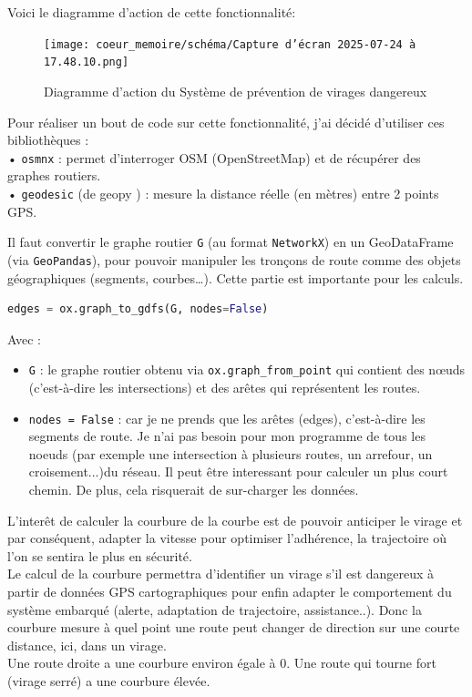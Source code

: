 Voici le diagramme d'action de cette fonctionnalité:\\

\begin{figure}[H]
    \centering
    \texttt{[image: coeur\_memoire/schéma/Capture d’écran 2025-07-24 à 17.48.10.png]} 
    \caption{Diagramme d'action du Système de prévention de virages dangereux}
\end{figure}

Pour réaliser un bout de code sur cette fonctionnalité, j'ai décidé d'utiliser ces bibliothèques :\\
• \texttt{osmnx}\cite{osm_doc} : permet d’interroger OSM (OpenStreetMap) et de récupérer des graphes routiers.\\
• \texttt{geodesic} (de geopy \cite{geopy}) : mesure la distance réelle (en mètres) entre 2 points GPS.
\vspace{0.5cm}

Il faut convertir le graphe routier \texttt{G} (au format \texttt{NetworkX}) en un GeoDataFrame (via \texttt{GeoPandas}), pour pouvoir manipuler les tronçons de route comme des objets géographiques (segments, courbes…). Cette partie est importante pour les calculs.
\begin{lstlisting}[language=Python, caption={Conversion du graphe routier}]
edges = ox.graph_to_gdfs(G, nodes=False)
\end{lstlisting}
Avec : \\
\begin{itemize}
    \item \texttt{G} : le graphe routier obtenu via \texttt{ox.graph\_from\_point} qui contient des nœuds (c'est-à-dire les intersections) et des arêtes qui représentent les routes.
    \item \texttt{nodes = False} : car je ne prends que les arêtes (edges), c’est-à-dire les segments de route. Je n'ai pas besoin pour mon programme de tous les noeuds (par exemple une intersection à plusieurs routes, un arrefour, un croisement...)du réseau. Il peut être interessant pour calculer un plus court chemin. De plus, cela risquerait de sur-charger les données.
\end{itemize}

\vspace{0.5cm}
L'interêt de calculer la courbure de la courbe est de pouvoir anticiper le virage et par conséquent, adapter la vitesse pour optimiser l'adhérence, la trajectoire où l'on se sentira le plus en sécurité. \\
Le calcul de la courbure permettra d'identifier un virage s'il est dangereux à partir de données GPS cartographiques pour enfin adapter le comportement du système embarqué (alerte, adaptation de trajectoire, assistance..).
Donc la courbure mesure à quel point une route peut changer de direction sur une courte distance, ici, dans un virage.\\
Une route droite a une courbure environ égale à 0. Une route qui tourne fort (virage serré) a une courbure élevée.

